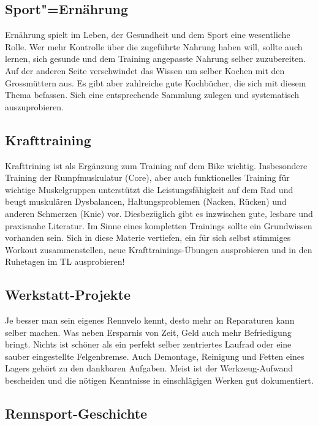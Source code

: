 \documentclass[a4paper,DIV13,BCOR0cm,draft=TRUE]{scrartcl}
\newcommand{\rv}{Rennvelo}
\begin{document}
\subsection{Sport"=Ernährung}
\label{sec:sport-ernaehrung}

Ernährung spielt im Leben, der Gesundheit und dem Sport eine wesentliche Rolle.
Wer mehr Kontrolle über die zugeführte Nahrung haben will, sollte auch lernen,
sich gesunde und dem Training angepasste Nahrung selber zuzubereiten.
Auf der anderen Seite verschwindet das Wissen um selber Kochen mit den Grossmüttern
aus.
Es gibt aber zahlreiche gute Kochbücher, die sich mit diesem Thema befassen.
Sich eine entsprechende Sammlung zulegen und systematisch auszuprobieren.

\subsection{Krafttraining}
\label{sec:krafttraining}

Krafttrining ist als Ergänzung zum Training auf dem Bike wichtig.
Insbesondere Training der Rumpfmuskulatur (Core), aber auch funktionelles
Training für wichtige Muskelgruppen unterstützt die Leistungsfähigkeit auf dem Rad
und beugt muskulären Dysbalancen, Haltungsproblemen (Nacken, Rücken) und
anderen Schmerzen (Knie) vor. Diesbezüglich gibt es inzwischen gute, lesbare
und praxisnahe Literatur.
Im Sinne eines kompletten Trainings sollte ein Grundwissen vorhanden sein.
Sich in diese Materie vertiefen, ein für sich selbst stimmiges Workout zusammenstellen,
neue Krafttrainings-Übungen ausprobieren und in den Ruhetagen im TL ausprobieren!

\subsection{Werkstatt-Projekte}
\label{sec:werkstatt-projekte}

Je besser man sein eigenes \rv{} kennt, desto mehr an Reparaturen kann selber machen.
Was neben Ersparnis von Zeit, Geld auch mehr Befriedigung bringt.
Nichts ist schöner als ein perfekt selber zentriertes Laufrad oder eine sauber eingestellte Felgenbremse.
Auch Demontage, Reinigung und Fetten eines Lagers gehört zu den dankbaren Aufgaben.
Meist ist der Werkzeug-Aufwand bescheiden und die nötigen Kenntnisse in einschlägigen Werken
gut dokumentiert.

\subsection{Rennsport-Geschichte}
\label{sec:rennsport-geschichte}
\end{document}

